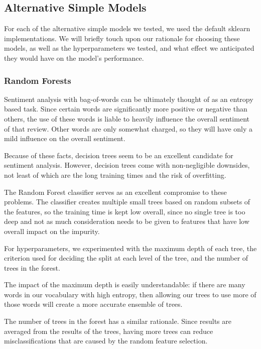 \documentclass[conference]{IEEEtran}
\begin{document}

\subsection{Alternative Simple Models}

For each of the alternative simple models we tested, we used the default sklearn implementations. We will briefly touch upon our rationale for choosing these models, as well as the hyperparameters we tested, and what effect we anticipated they would have on the model's performance.

\subsubsection{Random Forests}

Sentiment analysis with bag-of-words can be ultimately thought of as an entropy based task. Since certain words are significantly more positive or negative than others, the use of these words is liable to heavily influence the overall sentiment of that review. Other words are only somewhat charged, so they will have only a mild influence on the overall sentiment.

Because of these facts, decision trees seem to be an excellent candidate for sentiment analysis. However, decision trees come with non-negligible downsides, not least of which are the long training times and the risk of overfitting.

The Random Forest classifier serves as an excellent compromise to these problems. The classifier creates multiple small trees based on random subsets of the features, so the training time is kept low overall, since no single tree is too deep and not as much consideration needs to be given to features that have low overall impact on the impurity.

For hyperparameters, we experimented with the maximum depth of each tree, the criterion used for deciding the split at each level of the tree, and the number of trees in the forest.

The impact of the maximum depth is easily understandable: if there are many words in our vocabulary with high entropy, then allowing our trees to use more of those words will create a more accurate ensemble of trees.

The number of trees in the forest has a similar rationale. Since results are averaged from the results of the trees, having more trees can reduce misclassifications that are caused by the random feature selection.
\end{document}
